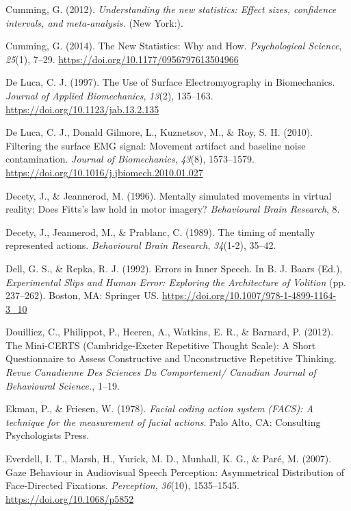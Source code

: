 \documentclass[a4paper,12pt,twoside,openright,oldfontcommands]{memoir}
\begin{document}
\hypertarget{ref-Cumming2012}{}
Cumming, G. (2012). \emph{Understanding the new statistics: Effect
sizes, confidence intervals, and meta-analysis.} (New York:).

\hypertarget{ref-cumming_new_2014}{}
Cumming, G. (2014). The New Statistics: Why and How. \emph{Psychological
Science}, \emph{25}(1), 7--29.
\url{https://doi.org/10.1177/0956797613504966}

\hypertarget{ref-de_luca_use_1997}{}
De Luca, C. J. (1997). The Use of Surface Electromyography in
Biomechanics. \emph{Journal of Applied Biomechanics}, \emph{13}(2),
135--163. \url{https://doi.org/10.1123/jab.13.2.135}

\hypertarget{ref-de_luca_filtering_2010}{}
De Luca, C. J., Donald Gilmore, L., Kuznetsov, M., \& Roy, S. H. (2010).
Filtering the surface EMG signal: Movement artifact and baseline noise
contamination. \emph{Journal of Biomechanics}, \emph{43}(8), 1573--1579.
\url{https://doi.org/10.1016/j.jbiomech.2010.01.027}

\hypertarget{ref-decety_mentally_1996}{}
Decety, J., \& Jeannerod, M. (1996). Mentally simulated movements in
virtual reality: Does Fitts's law hold in motor imagery?
\emph{Behavioural Brain Research}, 8.

\hypertarget{ref-decety_timing_1989}{}
Decety, J., Jeannerod, M., \& Prablanc, C. (1989). The timing of
mentally represented actions. \emph{Behavioural Brain Research},
\emph{34}(1-2), 35--42.

\hypertarget{ref-dell_errors_1992}{}
Dell, G. S., \& Repka, R. J. (1992). Errors in Inner Speech. In B. J.
Baars (Ed.), \emph{Experimental Slips and Human Error: Exploring the
Architecture of Volition} (pp. 237--262). Boston, MA: Springer US.
\url{https://doi.org/10.1007/978-1-4899-1164-3_10}

\hypertarget{ref-Douilliez2012}{}
Douilliez, C., Philippot, P., Heeren, A., Watkins, E. R., \& Barnard, P.
(2012). The Mini-CERTS (Cambridge-Exeter Repetitive Thought Scale): A
Short Questionnaire to Assess Constructive and Unconstructive Repetitive
Thinking. \emph{Revue Canadienne Des Sciences Du Comportement/ Canadian
Journal of Behavioural Science.}, 1--19.

\hypertarget{ref-ekman_facial_1978}{}
Ekman, P., \& Friesen, W. (1978). \emph{Facial coding action system
(FACS): A technique for the measurement of facial actions}. Palo Alto,
CA: Consulting Psychologists Press.

\hypertarget{ref-everdell_gaze_2007}{}
Everdell, I. T., Marsh, H., Yurick, M. D., Munhall, K. G., \& Paré, M.
(2007). Gaze Behaviour in Audiovisual Speech Perception: Asymmetrical
Distribution of Face-Directed Fixations. \emph{Perception},
\emph{36}(10), 1535--1545. \url{https://doi.org/10.1068/p5852}
\end{document}

